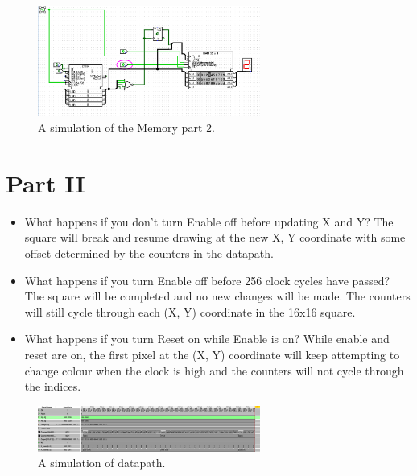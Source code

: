 \documentclass{article}
\begin{document}
\begin{enumerate}
\begin{figure}[ht!]
    \centering
    \includegraphics[width=0.65\textwidth]{lab7_Memory Simulation2.png}
    \caption{A simulation of the Memory part 2.}
    \label{f:part1_simulation}
\end{figure}

\end{enumerate}
\newpage
\section{Part II}

\begin{itemize}

\item What happens if you don’t turn Enable off before updating X and Y?
The square will break and resume drawing at the new X, Y coordinate with some offset determined by the counters in the datapath.
\item What happens if you turn Enable off before 256 clock cycles have passed?
The square will be completed and no new changes will be made. The counters will still cycle through each (X, Y) coordinate in the 16x16 square.
\item What happens if you turn Reset on while Enable is on?
While enable and reset are on, the first pixel at the (X, Y) coordinate will keep attempting to change colour when the clock is high and the counters will not cycle through the indices.

\end{itemize}

\begin{figure}[ht!]
    \centering
    \includegraphics[width=0.65\textwidth]{datapath_timing.png}
    \caption{A simulation of datapath.}
    \label{f:part1_simulation}
\end{figure}
\end{document}
